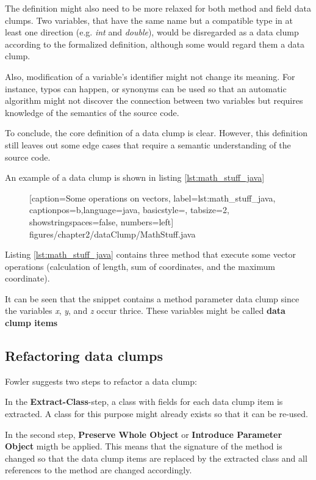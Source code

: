 The definition might also need to be more relaxed for both method and field data clumps. Two variables, that have the same name but a compatible type in at least one direction  (e.g. \textit{int} and  \textit{double}), would be disregarded as a data clump according to the formalized definition, although some would regard them a data clump.

Also, modification of a variable's identifier might not change its meaning. For instance, typos can happen, or synonyms can be used so that an automatic algorithm might not discover the connection between two variables but requires knowledge of the semantics of the source code. \cite{zhangImprovingPrecisionFowler2008}


To conclude, the core definition of a data clump is clear. However, this definition still leaves out some edge cases that require a semantic understanding of the source code. 

An example of a data clump is shown in listing \ref{lst:math_stuff_java}
\begin{figure} [htbp!]
			
			[caption={Some operations on vectors},
			label={lst:math_stuff_java},
			captionpos=b,language=java, basicstyle=\footnotesize, tabsize=2, showstringspaces=false,  numbers=left]
			{figures/chapter2/dataClump/MathStuff.java}
		\end{figure}



Listing \ref{lst:math_stuff_java} contains three method that execute some vector operations (calculation of length, sum of coordinates, and the maximum coordinate). 


It can be seen that  the snippet contains a method parameter data clump since the variables \textit{x}, \textit{y}, and  \textit{z} occur thrice.  These variables might be called \textbf{data clump items}
  
\subsection{Refactoring data clumps}
Fowler suggests two  steps to refactor a data clump:

In the  \textbf{Extract-Class}-step, a class with fields for each data clump item is extracted. A class for this purpose might already exists so that it can be re-used.

In the second step, \textbf{Preserve Whole Object} or \textbf{Introduce Parameter Object} migth be applied. This means that the signature of the method is changed so that the data clump items are replaced by the extracted class and all references to the method are changed accordingly.


